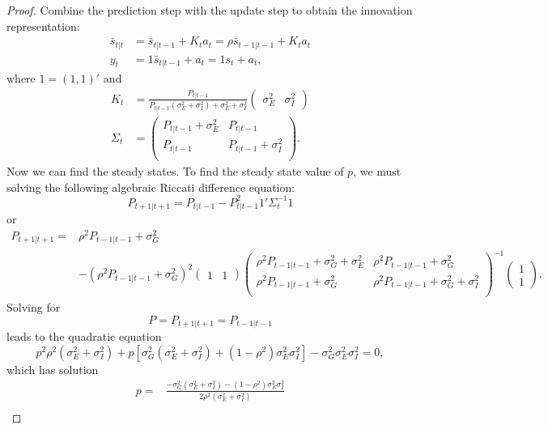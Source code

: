 \documentclass[oneside,reqno]{amsart}
\theoremstyle{definition}
\begin{document}
\begin{enumerate}[label=(\roman*)]
\begin{proof}
Combine the prediction step with the update step to obtain the innovation representation:
\begin{align*}
	\bar s_{t|t} &=  \bar s_{t|t-1} + K_t a_t = \rho \bar s_{t-1|t-1} + K_t a_t \\
	y_t &= 1 \bar s_{t|t-1} + a_t = 1 s_t + a_t,
\end{align*}
where $1 = (1,1)'$ and 
\begin{align*}
	K_t &= \frac{P_{t|t-1}}{P_{t|t-1}(\sigma_{E}^2 + \sigma_{I}^2) + \sigma_{E}^2 + \sigma_{I}^2} 
	\begin{pmatrix} 
		\sigma_{E}^2 & \sigma_{I}^2 
	\end{pmatrix} \\
	\Sigma_t &= \begin{pmatrix}
			P_{t|t-1} + \sigma_{E}^2 & P_{t|t-1} \\
			P_{t|t-1}  & P_{t|t-1} + \sigma_{I}^2 \\
		\end{pmatrix}.
\end{align*}
Now we can find the steady states. To find the steady state value of $p$, we must solving the following algebraic Riccati difference equation: 
\[
	 P_{t+1|t+1} = P_{t|t-1} - P_{t|t-1}^2 1' \Sigma_t^{-1} 1
\]
or 
\begin{align*}
	 P_{t+1|t+1} ={}&  \rho^2 P_{t-1|t-1} + \sigma_{G}^2 \\
	 &- (\rho^2 P_{t-1|t-1} + \sigma_{G}^2)^2 
	\begin{pmatrix} 1 & 1 \end{pmatrix}   
	    \begin{pmatrix}
		\rho^2 P_{t-1|t-1} + \sigma_{G}^2 + \sigma_{E}^2 & \rho^2 P_{t-1|t-1} + \sigma_{G}^2 \\
		\rho^2 P_{t-1|t-1} + \sigma_{G}^2  & \rho^2 P_{t-1|t-1} + \sigma_{G}^2 + \sigma_{I}^2 \\
		\end{pmatrix}^{-1}
	\begin{pmatrix} 1 \\ 1 \end{pmatrix}.
\end{align*}
Solving for 
\[
	P = P_{t+1|t+1}= P_{t-1|t-1}
\] 
leads to the quadratic equation
\[
	p^2 \rho^2 (\sigma_{E}^2 + \sigma_{I}^2) + p [\sigma_{G}^2(\sigma_{E}^2 + \sigma_{I}^2) + (1-\rho^2) \sigma_{E}^2 \sigma_{I}^2 ] - \sigma_{G}^2\sigma_{E}^2\sigma_{I}^2 = 0,
\]
which has solution 
\begin{align*}
	p =&{} \frac{-\sigma_{G}^2(\sigma_{E}^2 + \sigma_{I}^2) - (1-\rho^2) \sigma_{E}^2 \sigma_{I}^2}{2 \rho^2 (\sigma_{E}^2 + \sigma_{I}^2)} \\

\end{align*}
\end{proof}
\end{enumerate}
\end{document}

